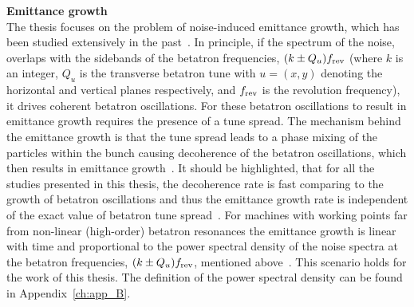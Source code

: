 \textbf{Emittance growth}\\
The thesis focuses on the problem of noise-induced emittance growth, which has been studied extensively in the past~\cite{Lebedev:248620, Lebedev:248622, PhysRevSTAB.18.101001}. In principle, if the spectrum of the noise, overlaps with the sidebands of the betatron frequencies, $(k \pm Q_u) {f_\mathrm{rev}}$ (where $k$ is an integer, $Q_u$ is the transverse betatron tune with $u=(x,y)$ denoting the horizontal and vertical planes respectively, and ${f_\mathrm{rev}}$ is the revolution frequency), it drives coherent betatron oscillations. For these betatron oscillations to result in emittance growth requires the presence of a tune spread. The mechanism behind the emittance growth is that the tune spread leads to a phase mixing of the particles within the bunch causing decoherence of the betatron oscillations, which then results in emittance growth~\cite{Lebedev:248620}. It should be highlighted, that for all the studies presented in this thesis, the decoherence rate is fast comparing to the growth of betatron oscillations and thus the emittance growth rate is independent of the exact value of betatron tune spread~\cite{Lebedev:248620}. For machines with working points far from non-linear (high-order) betatron resonances the emittance growth is linear with time and proportional to the power spectral density of the noise spectra at the betatron frequencies, $(k \pm Q_u) {f_\mathrm{rev}}$, mentioned above~\cite{Lebedev:248620}. This scenario holds for the work of this thesis. The definition of the power spectral density can be found in Appendix~\ref{ch:app_B}. 



